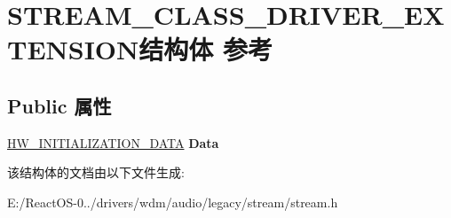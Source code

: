 \hypertarget{struct_s_t_r_e_a_m___c_l_a_s_s___d_r_i_v_e_r___e_x_t_e_n_s_i_o_n}{}\section{S\+T\+R\+E\+A\+M\+\_\+\+C\+L\+A\+S\+S\+\_\+\+D\+R\+I\+V\+E\+R\+\_\+\+E\+X\+T\+E\+N\+S\+I\+O\+N结构体 参考}
\label{struct_s_t_r_e_a_m___c_l_a_s_s___d_r_i_v_e_r___e_x_t_e_n_s_i_o_n}
\subsection*{Public 属性}
\begin{DoxyCompactItemize}
\item 
\mbox{\label{struct_s_t_r_e_a_m___c_l_a_s_s___d_r_i_v_e_r___e_x_t_e_n_s_i_o_n_a4a49b2eafeec6e520365b881d4b69415}} 
\hyperlink{struct___h_w___i_n_i_t_i_a_l_i_z_a_t_i_o_n___d_a_t_a}{H\+W\+\_\+\+I\+N\+I\+T\+I\+A\+L\+I\+Z\+A\+T\+I\+O\+N\+\_\+\+D\+A\+TA} {\bfseries Data}
\end{DoxyCompactItemize}


该结构体的文档由以下文件生成\+:\begin{DoxyCompactItemize}
\item 
E\+:/\+React\+O\+S-\/0../drivers/wdm/audio/legacy/stream/stream.\+h\end{DoxyCompactItemize}
